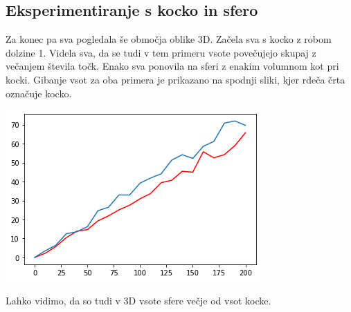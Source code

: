 \documentclass[12pt, a4paper]{article}
\begin{document}
\subsection{Eksperimentiranje s kocko in sfero}
Za konec pa sva pogledala še območja oblike 3D. Začela sva s kocko z robom dolzine 1. Videla sva, da se tudi v tem primeru vsote povečujejo skupaj z večanjem števila točk. Enako sva ponovila na sferi z enakim volumnom kot pri kocki. Gibanje vsot za oba primera je prikazano na spodnji sliki, kjer rdeča črta označuje kocko.
\begin{center}
\includegraphics{primerjava_kocka_sfera.png}
\end{center}
Lahko vidimo, da so tudi v 3D vsote sfere večje od vsot kocke.
\end{document}

